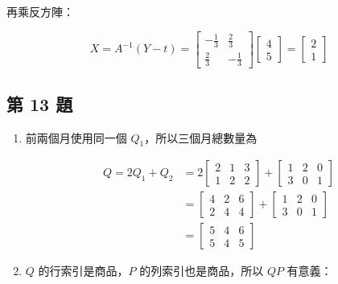 \documentclass[11pt,a4paper]{article}
\begin{document}
再乘反方陣：

\[
X=A^{-1}(Y-t)
=\begin{bmatrix}-\frac13&\frac23\\\frac23&-\frac13\end{bmatrix}
\begin{bmatrix}4\\5\end{bmatrix}
=\begin{bmatrix}2\\1\end{bmatrix}
\]

\subsection{第 13 題}\label{ux7b2c-13-ux984c}

\begin{enumerate}
\def\labelenumi{\arabic{enumi}.}
\item
  前兩個月使用同一個 \(Q_1\)，所以三個月總數量為

  \[
  \begin{aligned}
  Q=2Q_1+Q_2
  &=2\begin{bmatrix}2&1&3\\1&2&2\end{bmatrix}
  +\begin{bmatrix}1&2&0\\3&0&1\end{bmatrix}\\
  &=\begin{bmatrix}4&2&6\\2&4&4\end{bmatrix}
  +\begin{bmatrix}1&2&0\\3&0&1\end{bmatrix}\\
  &=\begin{bmatrix}5&4&6\\5&4&5\end{bmatrix}
  \end{aligned}
  \]
\item
  \(Q\) 的行索引是商品，\(P\) 的列索引也是商品，所以 \(QP\) 有意義：


\end{enumerate}
\end{document}
